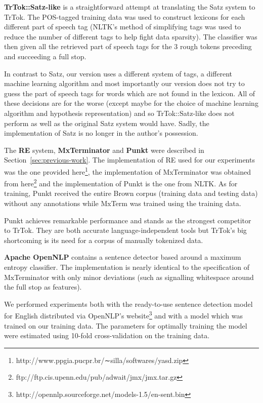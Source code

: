 \textbf{TrTok::Satz-like} is a straightforward attempt at translating
the Satz system to TrTok. The POS-tagged training data was used to
construct lexicons for each different part of speech tag (NLTK's
method of simplifying tags was used to reduce the number of different
tags to help fight data sparsity). The classifier was then given all
the retrieved part of speech tags for the 3 rough tokens preceding and
succeeding a full stop.

In contrast to Satz, our version uses a different system of tags, a
different machine learning algorithm and most importantly our version
does not try to guess the part of speech tags for words which are not
found in the lexicon. All of these decisions are for the worse (except
maybe for the choice of machine learning algorithm and hypothesis
representation) and so TrTok::Satz-like does not perform as well as
the original Satz system would have. Sadly, the implementation of Satz
is no longer in the author's possession.

The \textbf{RE} system, \textbf{MxTerminator} and \textbf{Punkt} were
described in Section~\ref{sec:previous-work}. The implementation of RE
used for our experiments was the one provided
here\footnote{http://www.ppgia.pucpr.br/∼silla/softwares/yasd.zip},
the implementation of MxTerminator was obtained from
here\footnote{ftp://ftp.cis.upenn.edu/pub/adwait/jmx/jmx.tar.gz} and
the implementation of Punkt is the one from NLTK. As for training,
Punkt received the entire Brown corpus (training data and testing
data) without any annotations while MxTerm was trained using the
training data.

Punkt achieves remarkable performance and stands as the strongest
competitor to TrTok. They are both accurate language-independent tools
but TrTok's big shortcoming is its need for a corpus of manually
tokenized data.

\textbf{Apache OpenNLP} contains a sentence detector based around a
maximum entropy classifier. The implementation is nearly identical to
the specification of MxTerminator with only minor deviations (such as
signalling whitespace around the full stop as features).

We performed experiments both with the ready-to-use sentence detection
model for English distributed via OpenNLP's
website\footnote{http://opennlp.sourceforge.net/models-1.5/en-sent.bin}
and with a model which was trained on our training data. The
parameters for optimally training the model were estimated using
10-fold cross-validation on the training data.

